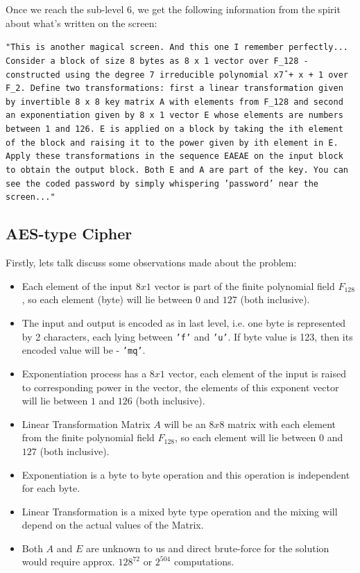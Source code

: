 \documentclass[10pt,twoside]{article}
\begin{document}
Once we reach the sub-level 6, we get the following information from the spirit about what's written on the screen:

\texttt{"This is another magical screen. And this one I remember perfectly... Consider a block of size 8 bytes as 8 x 1 vector over F\_{128} - constructed using the degree 7 irreducible polynomial x\^7 + x + 1 over F\_2. Define two transformations: first a linear transformation given by invertible 8 x 8 key matrix A with elements from F\_{128} and second an exponentiation given by 8 x 1 vector E whose elements are numbers between 1 and 126. E is applied on a block by taking the ith element of the block and raising it to the power given by ith element in E. Apply these transformations in the sequence EAEAE on the input block to obtain the output block. Both E and A are part of the key. You can see the coded password by simply whispering 'password' near the screen..."}

\subsection{AES-type Cipher}

Firstly, lets talk discuss some observations made about the problem:
\begin{itemize}
  \setlength\itemsep{0em}
  \item Each element of the input $8x1$ vector is part of the finite polynomial field $F_{128}$, so each element (byte) will lie between $0$ and $127$ (both inclusive).
  \item The input and output is encoded as in last level, i.e. one byte is represented by 2 characters, each lying between \texttt{'f'} and \texttt{'u'}. If byte value is 123, then its encoded value will be - \texttt{'mq'}.
  \item Exponentiation process has a $8x1$ vector, each element of the input is raised to corresponding power in the vector, the elements of this exponent vector will lie between $1$ and $126$ (both inclusive).
  \item Linear Transformation Matrix $A$ will be an $8x8$ matrix with each element from the finite polynomial field $F_{128}$, so each element will lie between $0$ and $127$ (both inclusive).
  \item Exponentiation is a byte to byte operation and this operation is independent for each byte.
  \item Linear Transformation is a mixed byte type operation and the mixing will depend on the actual values of the Matrix.
  \item Both $A$ and $E$ are unknown to us and direct brute-force for the solution would require approx. $128^{72}$ or $2^{504}$ computations. \newline
\end{itemize}
\end{document}
